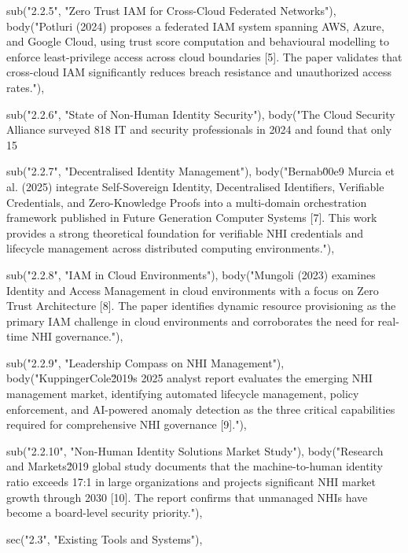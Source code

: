   sub("2.2.5", "Zero Trust IAM for Cross-Cloud Federated Networks"),
  body("Potluri (2024) proposes a federated IAM system spanning AWS, Azure, and Google Cloud, using trust score computation and behavioural modelling to enforce least-privilege access across cloud boundaries [5]. The paper validates that cross-cloud IAM significantly reduces breach resistance and unauthorized access rates."),

  sub("2.2.6", "State of Non-Human Identity Security"),
  body("The Cloud Security Alliance surveyed 818 IT and security professionals in 2024 and found that only 15%

  sub("2.2.7", "Decentralised Identity Management"),
  body("Bernab\u00e9 Murcia et al. (2025) integrate Self-Sovereign Identity, Decentralised Identifiers, Verifiable Credentials, and Zero-Knowledge Proofs into a multi-domain orchestration framework published in Future Generation Computer Systems [7]. This work provides a strong theoretical foundation for verifiable NHI credentials and lifecycle management across distributed computing environments."),

  sub("2.2.8", "IAM in Cloud Environments"),
  body("Mungoli (2023) examines Identity and Access Management in cloud environments with a focus on Zero Trust Architecture [8]. The paper identifies dynamic resource provisioning as the primary IAM challenge in cloud environments and corroborates the need for real-time NHI governance."),

  sub("2.2.9", "Leadership Compass on NHI Management"),
  body("KuppingerCole\u2019s 2025 analyst report evaluates the emerging NHI management market, identifying automated lifecycle management, policy enforcement, and AI-powered anomaly detection as the three critical capabilities required for comprehensive NHI governance [9]."),

  sub("2.2.10", "Non-Human Identity Solutions Market Study"),
  body("Research and Markets\u2019 global study documents that the machine-to-human identity ratio exceeds 17:1 in large organizations and projects significant NHI market growth through 2030 [10]. The report confirms that unmanaged NHIs have become a board-level security priority."),

  sec("2.3", "Existing Tools and Systems"),


